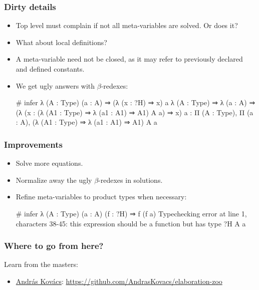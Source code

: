 \documentclass[handout,10pt,aspectratio=169]{beamer}
\begin{document}
\begin{frame}[fragile]
  \frametitle{Dirty details}

  \begin{itemize}
  \item Top level must complain if not all meta-variables are solved. Or does it?
  \item What about local definitions?
  \item A meta-variable need not be closed, as it may refer to previously declared and defined constants.
  \item We get ugly answers with $\beta$-redexes:
\small
\begin{fauxttlisting}
# infer λ (A : Type) (a : A) ⇒ (λ (x : ?H) ⇒ x) a
λ (A : Type) ⇒ λ (a : A) ⇒
  (λ (x : (λ (A1 : Type) ⇒ λ (a1 : A1) ⇒ A1) A a) ⇒ x) a
     : Π (A : Type), Π (a : A), (λ (A1 : Type) ⇒ λ (a1 : A1) ⇒ A1) A a
\end{fauxttlisting}
  \end{itemize}
\end{frame}

\begin{frame}[fragile]
  \frametitle{Improvements}

  \begin{itemize}
  \item Solve more equations.
  \item Normalize away the ugly $\beta$-redexes in solutions.
  \item Refine meta-variables to product types when necessary:
\begin{fauxttlisting}
# infer λ (A : Type) (a : A) (f : ?H) ⇒ f (f a)
Typechecking error at line 1, characters 38-45:
this expression should be a function but has type ?H A a
\end{fauxttlisting}
  \end{itemize}
\end{frame}

\begin{frame}
  \frametitle{Where to go from here?}

  Learn from the masters:
  \begin{itemize}
  \item \href{https://andraskovacs.github.io}{András Kovács}: \url{https://github.com/AndrasKovacs/elaboration-zoo}
  \end{itemize}
\end{frame}
\end{document}
